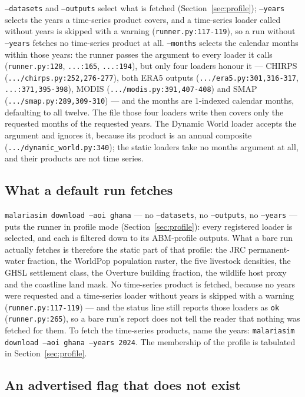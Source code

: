 \documentclass[11pt,a4paper]{article}
\newcommand{\code}[1]{\texttt{#1}}
\begin{document}
\code{--datasets} and \code{--outputs} select what is fetched
(Section~\ref{sec:profile}); \code{--years} selects the years a time-series
product covers, and a time-series loader called without years is skipped
with a warning (\code{runner.py:117-119}), so a run without \code{--years}
fetches no time-series product at all. \code{--months} selects the calendar
months within those years: the runner passes the argument to every loader
it calls (\code{runner.py:128}, \code{...:165}, \code{...:194}), but only
four loaders honour it --- CHIRPS (\code{.../chirps.py:252,276-277}), both
ERA5 outputs (\code{.../era5.py:301,316-317}, \code{...:371,395-398}),
MODIS (\code{.../modis.py:391,407-408}) and SMAP
(\code{.../smap.py:289,309-310}) --- and the months are 1-indexed calendar
months, defaulting to all twelve. The file those four loaders write then
covers only the requested months of the requested years. The Dynamic World
loader accepts the argument and ignores it, because its product is an annual
composite (\code{.../dynamic\_world.py:340}); the static loaders take no
months argument at all, and their products are not time series.

\subsection{What a default run fetches}

\code{malariasim download --aoi ghana} --- no \code{--datasets}, no
\code{--outputs}, no \code{--years} --- puts the runner in profile mode
(Section~\ref{sec:profile}): every registered loader is selected, and each
is filtered down to its ABM-profile outputs. What a bare run actually
fetches is therefore the static part of that profile: the JRC permanent-water
fraction, the WorldPop population raster, the five livestock densities, the
GHSL settlement class, the Overture building fraction, the wildlife host
proxy and the coastline land mask. No time-series product is fetched,
because no years were requested and a time-series loader without years is
skipped with a warning (\code{runner.py:117-119}) --- and the status line
still reports those loaders as \code{ok} (\code{runner.py:265}), so a bare
run's report does not tell the reader that nothing was fetched for them. To
fetch the time-series products, name the years: \code{malariasim download
--aoi ghana --years 2024}. The membership of the profile is tabulated in
Section~\ref{sec:profile}.

\subsection{An advertised flag that does not exist}
\end{document}
